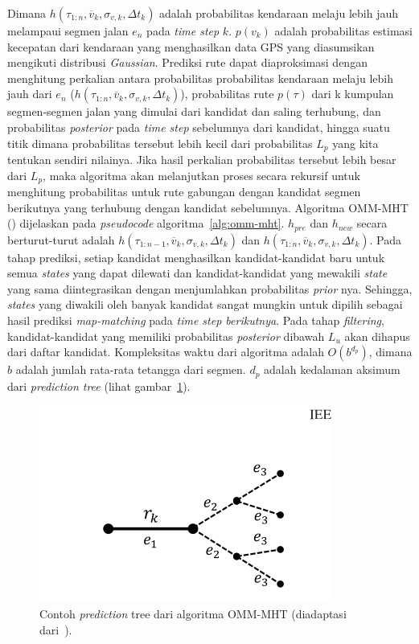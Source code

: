 Dimana $h(\tau_{1:n},\overline{v}_k,\sigma_{v,k},\Delta t_k)$ adalah probabilitas kendaraan melaju lebih jauh melampaui segmen jalan $e_n$ pada \textit{time step } $k$. $p(v_k)$ adalah probabilitas estimasi kecepatan dari kendaraan yang menghasilkan data GPS yang diasumsikan mengikuti distribusi \textit{Gaussian}. Prediksi rute dapat diaproksimasi dengan menghitung perkalian antara probabilitas probabilitas kendaraan melaju lebih jauh dari $e_n$ ($h(\tau_{1:n},\overline{v}_k,\sigma_{v,k},\Delta t_k)$), probabilitas rute $p(\tau)$ dari k kumpulan segmen-segmen jalan yang dimulai dari kandidat dan saling terhubung, dan probabilitas \textit{posterior} pada \textit{time step} sebelumnya dari kandidat, hingga suatu titik dimana probabilitas tersebut lebih kecil dari probabilitas $L_p$ yang kita tentukan sendiri nilainya. Jika hasil perkalian probabilitas tersebut lebih besar dari $L_p$, maka algoritma akan melanjutkan proses secara rekursif untuk menghitung probabilitas untuk rute gabungan dengan kandidat segmen berikutnya yang terhubung dengan kandidat sebelumnya. Algoritma OMM-MHT (\cite{Taguchi2019}) dijelaskan pada \textit{pseudocode} algoritma~\ref{alg:omm-mht}. $h_{pre}$ dan $h_{new}$ secara berturut-turut adalah $h(\tau_{1:n-1}, \overline{v}_k,\sigma_{v,k},\Delta t_k)$ dan $h(\tau_{1:n}, \overline{v}_k,\sigma_{v,k},\Delta t_k)$. Pada tahap prediksi, setiap kandidat menghasilkan kandidat-kandidat baru untuk semua \textit{states} yang dapat dilewati dan kandidat-kandidat yang mewakili \textit{state} yang sama diintegrasikan dengan menjumlahkan probabilitas \textit{prior} nya. Sehingga, \textit{states} yang diwakili oleh banyak kandidat sangat mungkin untuk dipilih sebagai hasil prediksi \textit{map-matching} pada \textit{time step berikutnya}. Pada tahap \textit{filtering}, kandidat-kandidat yang memiliki probabilitas \textit{posterior} dibawah $L_u$ akan dihapus dari daftar kandidat. Kompleksitas waktu dari algoritma adalah $O(b^{d_p})$, dimana $b$ adalah jumlah rata-rata tetangga dari segmen. $d_p$ adalah kedalaman aksimum dari \textit{prediction tree} (lihat gambar~\ref{fig:prediction-tree-omm}).


\begin{figure}[H]
    \centering
    \includegraphics[]{figures/prediction_tree_omm.png}
    \caption{Contoh \textit{prediction} tree dari algoritma OMM-MHT (diadaptasi dari~\cite{Taguchi2019}).}
    \label{fig:prediction-tree-omm}
\end{figure}





